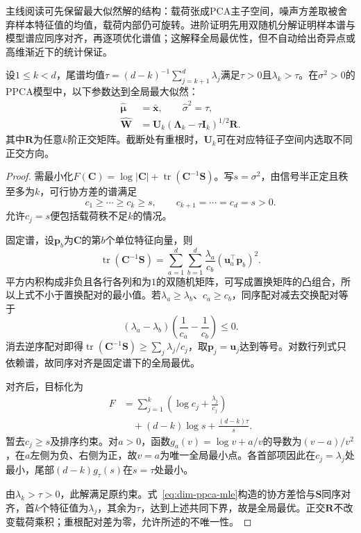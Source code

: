 主线阅读可先保留最大似然解的结构：载荷张成PCA主子空间，噪声方差取被舍弃样本特征值的均值，载荷内部仍可旋转。进阶证明先用双随机分解证明样本谱与模型谱应同序对齐，再逐项优化谱值；这解释全局最优性，但不自动给出奇异点或高维渐近下的统计保证。

\begin{theorem}[PPCA的最大似然解]
\label{thm:dim-ppca-mle}
设$1\leq k<d$，尾谱均值$\tau=(d-k)^{-1}\sum_{j=k+1}^d\lambda_j$满足$\tau>0$且$\lambda_k>\tau$。在$\sigma^2>0$的PPCA模型中，以下参数达到全局最大似然：
\begin{equation}
\label{eq:dim-ppca-mle}
\begin{aligned}
\hat{\bm{\mu}}&=\bar{\bm{x}},\qquad
\hat{\sigma}^2=\tau,\\
\hat{\bm{W}}&=\bm{U}_k(\bm{\Lambda}_k-\tau\bm{I}_k)^{1/2}\bm{R}.
\end{aligned}
\end{equation}
其中$\bm{R}$为任意$k$阶正交矩阵。截断处有重根时，$\bm{U}_k$可在对应特征子空间内选取不同正交方向。
\end{theorem}

\begin{proof}
需最小化$F(\bm{C})=\log|\bm{C}|+\operatorname{tr}(\bm{C}^{-1}\bm{S})$。写$s=\sigma^2$，由信号半正定且秩至多为$k$，可行协方差的谱满足
\[
c_1\geq\cdots\geq c_k\geq s,\qquad
c_{k+1}=\cdots=c_d=s>0.
\]
允许$c_j=s$便包括载荷秩不足$k$的情况。

固定谱，设$\bm{p}_b$为$\bm{C}$的第$b$个单位特征向量，则
\[
\operatorname{tr}(\bm{C}^{-1}\bm{S})
=\sum_{a=1}^d\sum_{b=1}^d
\frac{\lambda_a}{c_b}(\bm{u}_a^\top\bm{p}_b)^2.
\]
平方内积构成非负且各行各列和为$1$的双随机矩阵，可写成置换矩阵的凸组合，所以上式不小于置换配对的最小值。若$\lambda_a\geq\lambda_b$、$c_a\geq c_b$，同序配对减去交换配对等于
\[
(\lambda_a-\lambda_b)
\left(\frac{1}{c_a}-\frac{1}{c_b}\right)\leq0.
\]
消去逆序配对即得$\operatorname{tr}(\bm{C}^{-1}\bm{S})\geq\sum_j\lambda_j/c_j$，取$\bm{p}_j=\bm{u}_j$达到等号。对数行列式只依赖谱，故同序对齐是固定谱下的全局最优。

对齐后，目标化为
\[
\begin{aligned}
F&=\sum_{j=1}^k\left(\log c_j+\frac{\lambda_j}{c_j}\right)\\
&\quad+(d-k)\log s+\frac{(d-k)\tau}{s}.
\end{aligned}
\]
暂去$c_j\geq s$及排序约束。对$a>0$，函数$g_a(v)=\log v+a/v$的导数为$(v-a)/v^2$，在$a$左侧为负、右侧为正，故$v=a$为唯一全局最小点。各首部项因此在$c_j=\lambda_j$处最小，尾部$(d-k)g_\tau(s)$在$s=\tau$处最小。

由$\lambda_k>\tau>0$，此解满足原约束。式~\eqref{eq:dim-ppca-mle}构造的协方差恰与$\bm{S}$同序对齐，首$k$个特征值为$\lambda_j$，其余为$\tau$，达到上述共同下界，故是全局最优。正交$\bm{R}$不改变载荷乘积；重根配对差为零，允许所述的不唯一性。
\end{proof}

